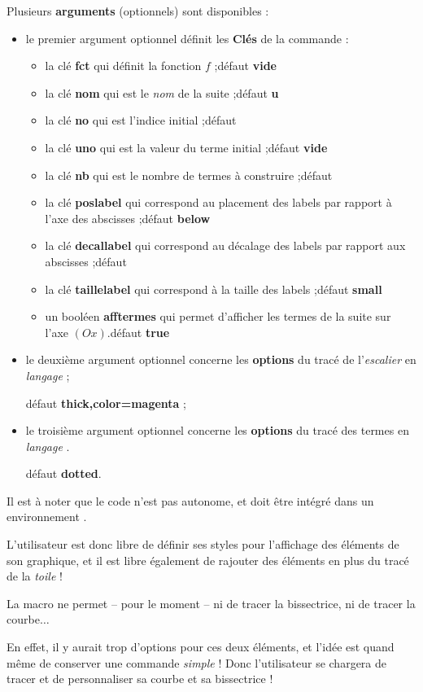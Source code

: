 \documentclass{article}
\newcommand\ctex[1]{\tcbox[vignettelatex]{#1}}
\newcommand\Cle[1]{{\bfseries\sffamily\textlangle #1\textrangle}}
\begin{document}
\begin{codecles}
Plusieurs \Cle{arguments} (optionnels) sont disponibles :

\begin{itemize}
	\item le premier argument optionnel définit les \Cle{Clés} de la commande :
	\begin{itemize}
		\item la clé \Cle{fct} qui définit la fonction $f$ ;\hfill{}défaut \Cle{vide}
		\item la clé \Cle{nom} qui est le \textit{nom} de la suite ;\hfill{}défaut \Cle{u}
		\item la clé \Cle{no} qui est l'indice initial ;\hfill{}défaut \Cle{0}
		\item la clé \Cle{uno} qui est la valeur du terme initial ;\hfill{}défaut \Cle{vide}
		\item la clé \Cle{nb} qui est le nombre de termes à construire ;\hfill{}défaut \Cle{5}
		\item la clé \Cle{poslabel} qui correspond au placement des labels par rapport à l'axe des abscisses ;\hfill{}défaut \Cle{below}
		\item la clé \Cle{decallabel} qui correspond au décalage des labels par rapport aux abscisses ;\hfill{}défaut \Cle{6pt}
		\item la clé \Cle{taillelabel} qui correspond à la taille des labels ;\hfill{}défaut \Cle{small}
		\item un booléen \Cle{afftermes} qui permet d'afficher les termes de la suite sur l'axe $(Ox)$.\hfill{}défaut \Cle{true}
	\end{itemize}
	\item le deuxième argument optionnel concerne les \Cle{options} du tracé de l'\textit{escalier} en \textit{langage \TikZ} ;
	
	\hfill{}défaut \Cle{thick,color=magenta} ;
	\item le troisième argument optionnel concerne les \Cle{options} du tracé des termes en \textit{langage \TikZ}.
	
	\hfill{}défaut \Cle{dotted}.
\end{itemize}
\end{codecles}

\begin{codeinfo}
Il est à noter que le \textsf{code} n'est pas autonome, et doit être intégré dans un environnement \ctex{tikzpicture}.

\smallskip

L'utilisateur est donc libre de définir ses styles pour l'affichage des éléments de son graphique, et il est libre également de rajouter des éléments en plus du tracé de la \textit{toile} !

\smallskip

La macro ne permet -- pour le moment -- ni de tracer la bissectrice, ni de tracer la courbe$\ldots$

En effet, il y aurait trop d'options pour ces deux éléments, et l'idée est quand même de conserver une commande \textit{simple} ! Donc l'utilisateur se chargera de tracer et de personnaliser sa courbe et sa bissectrice !
\end{codeinfo}
\end{document}

